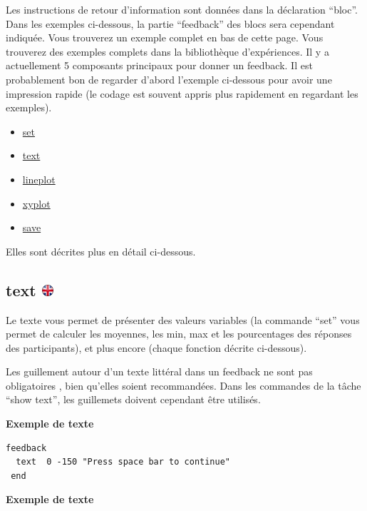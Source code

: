 \documentclass[
]{book}
\providecommand{\tightlist}{%
  \setlength{\itemsep}{0pt}\setlength{\parskip}{0pt}}
\begin{document}
Les instructions de retour d'information sont données dans la déclaration ``bloc''. Dans les exemples ci-dessous, la partie ``feedback'' des blocs sera cependant indiquée. Vous trouverez un exemple complet en bas de cette page. Vous trouverez des exemples complets dans la bibliothèque d'expériences.
Il y a actuellement 5 composants principaux pour donner un feedback. Il est probablement bon de regarder d'abord l'exemple ci-dessous pour avoir une impression rapide (le codage est souvent appris plus rapidement en regardant les exemples).

\begin{itemize}
\tightlist
\item
  \protect\hyperlink{feedbackset}{set}
\item
  \protect\hyperlink{feedbacktext}{text}
\item
  \href{feedbacklineplot}{lineplot}
\item
  \href{feedbacklineplot}{xyplot}
\item
  \href{feedbacksave}{save}
\end{itemize}

Elles sont décrites plus en détail ci-dessous.

\hypertarget{text}{%
\subsection[text ]{\texorpdfstring{text \href{https://www.psytoolkit.org/doc3.1.0/feedback.html\#_text}{\protect\includegraphics{img/ukflag.png}}}{text }}\label{text}}

Le texte vous permet de présenter des valeurs variables (la commande ``set'' vous permet de calculer les moyennes, les min, max et les pourcentages des réponses des participants), et plus encore (chaque fonction décrite ci-dessous).

Les guillement autour d'un texte littéral dans un feedback ne sont pas obligatoires , bien qu'elles soient recommandées. Dans les commandes de la tâche ``show text'', les guillemets doivent cependant être utilisés.

\textbf{Exemple de texte}

\begin{verbatim}
feedback
  text  0 -150 "Press space bar to continue"
 end
\end{verbatim}

\textbf{Exemple de texte}
\end{document}
